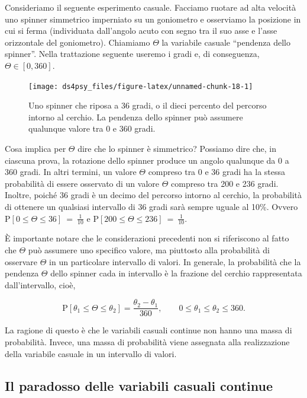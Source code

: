 \documentclass[
  11pt,
]{krantz}
\theoremstyle{definition}
\theoremstyle{definition}
\theoremstyle{definition}
\theoremstyle{definition}
\theoremstyle{remark}
\begin{document}
Consideriamo il seguente esperimento casuale. Facciamo ruotare ad alta velocità uno spinner simmetrico imperniato su un goniometro e osserviamo la posizione in cui si ferma (individuata dall'angolo acuto con segno tra il suo asse e l'asse orizzontale del goniometro). Chiamiamo \(\Theta\) la variabile casuale ``pendenza dello spinner''. Nella trattazione seguente useremo i gradi e, di conseguenza, \(\Theta \in [0, 360]\).

\begin{figure}[h]

{\centering \texttt{[image: ds4psy\_files/figure-latex/unnamed-chunk-18-1]} 

}

\caption{Uno spinner che riposa a 36 gradi, o il dieci percento del percorso intorno al cerchio. La pendenza dello spinner può assumere qualunque valore tra 0 e 360 gradi.}\label{fig:unnamed-chunk-18}
\end{figure}

Cosa implica per \(\Theta\) dire che lo spinner è simmetrico? Possiamo dire che, in ciascuna prova, la rotazione dello spinner produce un angolo qualunque da 0 a 360 gradi. In altri termini, un valore \(\Theta\) compreso tra 0 e 36 gradi ha la stessa probabilità di essere osservato di un valore \(\Theta\) compreso tra 200 e 236 gradi. Inoltre, poiché 36 gradi è un decimo del percorso intorno al cerchio, la probabilità di ottenere un qualsiasi intervallo di 36 gradi sarà sempre uguale al 10\%. Ovvero \(\mbox{P}[0 \leq \Theta \leq 36] \ = \ \frac{1}{10}\) e \(\mbox{P}[200 \leq \Theta \leq 236] \ = \ \frac{1}{10}\).

È importante notare che le considerazioni precedenti non si riferiscono al fatto che \(\Theta\) può assumere uno specifico valore, ma piuttosto alla probabilità di osservare \(\Theta\) in un particolare intervallo di valori. In generale, la probabilità che la pendenza \(\Theta\) dello spinner cada in intervallo è la frazione del cerchio rappresentata dall'intervallo, cioè,

\[
\mbox{P}[\theta_1 \leq \Theta \leq \theta_2] = \frac{\theta_2 - \theta_1}{360}, \qquad 0 \leq \theta_1 \leq \theta_2 \leq 360.
\]

La ragione di questo è che le variabili casuali continue non hanno una massa di probabilità. Invece, una massa di probabilità viene assegnata alla realizzazione della variabile casuale in un intervallo di valori.

\hypertarget{il-paradosso-delle-variabili-casuali-continue}{%
\subsection{Il paradosso delle variabili casuali continue}\label{il-paradosso-delle-variabili-casuali-continue}}
\end{document}
